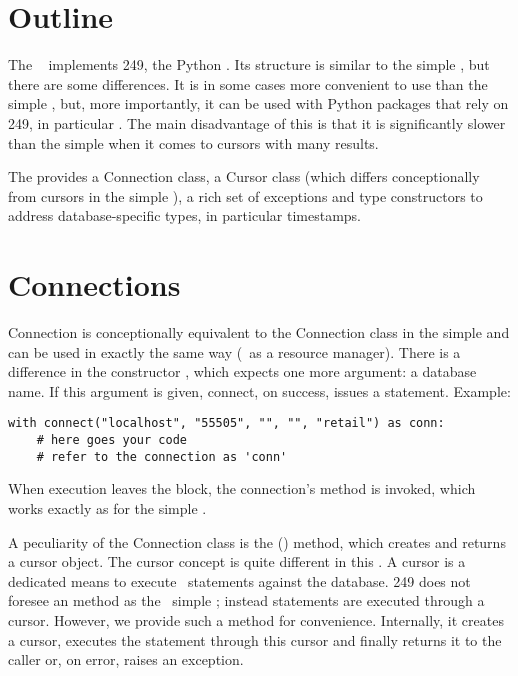 \section{Outline}
The \nowdb\  implements
 249, the Python .
Its structure is similar to the simple ,
but there are some differences.
It is in some cases more convenient to use
than the simple , but, more importantly,
it can be used with Python packages that rely on
 249, in particular .
The main disadvantage of this  is
that it is significantly slower
than the simple 
when it comes to cursors with many results.

The  provides a Connection class,
a Cursor class (which differs conceptionally
from cursors in the simple ),
a rich set of exceptions and type constructors
to address database-specific types,
in particular timestamps.

\section{Connections}
Connection is conceptionally equivalent
to the Connection class in the simple 
and can be used in exactly the same way (\eg\
as a resource manager).
There is a difference in the constructor
, which expects one more argument:
a database name. If this argument is given,
connect, on success, issues a  statement.
Example:

\begin{python}
\begin{lstlisting}
with connect("localhost", "55505", "", "", "retail") as conn:
    # here goes your code
    # refer to the connection as 'conn'
\end{lstlisting}
\end{python}

When execution leaves the  block,
the connection's  method is invoked,
which works exactly as for the simple .

A peculiarity of the Connection class is the () method,
which creates and returns a cursor object.
The cursor concept is quite different in this .
A cursor is a dedicated means to execute \sql\ statements
against the database.  249 does not foresee
an  method as the \nowdb\ simple ;
instead statements are executed through a cursor.
However, we provide such a method for convenience.
Internally, it creates a cursor, executes the statement
through this cursor and finally returns it to the caller
or, on error, raises an exception.

